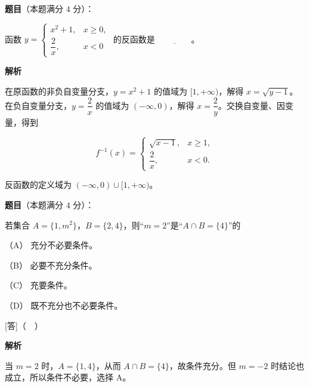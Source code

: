 \begin{answer}

\textbf{题目}（本题满分 $4$ 分）：

函数 $y=\begin{cases}x^2+1,&x\geq0,\\ \dfrac2x,&x<0\end{cases}$ 的反函数是 $\underline{\qquad\qquad}$。

\textbf{解析}

在原函数的非负自变量分支，$y=x^2+1$ 的值域为 $[1,+\infty)$，解得 $x=\sqrt{y-1}$。在负自变量分支，$y=\dfrac2x$ 的值域为 $(-\infty,0)$，解得 $x=\dfrac2y$。交换自变量、因变量，得到

\nopagebreak[4]
\[
f^{-1}(x)=
\begin{cases}
\sqrt{x-1},&x\ge1,\\
\dfrac2x,&x<0.
\end{cases}
\]

反函数的定义域为 $(-\infty,0)\cup[1,+\infty)$。

\gkanswer{答案：反函数为 $f^{-1}(x)=\begin{cases}\sqrt{x-1},&x\ge1,\\ \dfrac2x,&x<0.\end{cases}$，定义域为 $(-\infty,0)\cup[1,+\infty)$。}

\end{answer}
\begin{answer}

\textbf{题目}（本题满分 $4$ 分）：

若集合 $A=\{1,m^2\}$，$B=\{2,4\}$，则“$m=2$”是“$A\cap B=\{4\}$”的

（A） 充分不必要条件。

（B） 必要不充分条件。

（C） 充要条件。

（D） 既不充分也不必要条件。

[答]（　）

\textbf{解析}

当 $m=2$ 时，$A=\{1,4\}$，从而 $A\cap B=\{4\}$，故条件充分。但 $m=-2$ 时结论也成立，所以条件不必要，选择 A。


\end{answer}
